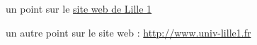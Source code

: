   \item un point sur le \href{http://www.univ-lille1.fr}{site web de Lille 1}
  \item un autre point sur le site web : \url{http://www.univ-lille1.fr}
